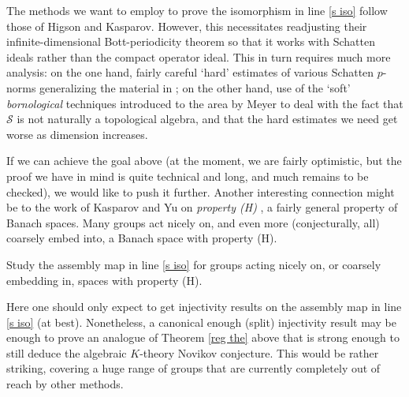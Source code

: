The methods we want to employ to prove the isomorphism in line \eqref{s iso} follow those of Higson and Kasparov.  However, this necessitates readjusting their infinite-dimensional Bott-periodicity theorem \cite{Higson:1999be} so that it works with Schatten ideals rather than the compact operator ideal.  This in turn requires much more analysis: on the one hand, fairly careful `hard' estimates of various Schatten $p$-norms generalizing the material in \cite[Chapter 4]{Simon:2005aa}; on the other hand, use of the `soft' \emph{bornological} techniques introduced to the area by Meyer \cite{Meyer:2007aa} to deal with the fact that $\mathcal{S}$ is not naturally a topological algebra, and that the hard estimates we need get worse as dimension increases.

If we can achieve the goal above (at the moment, we are fairly optimistic, but the proof we have in mind is quite technical and long, and much remains to be checked), we would like to push it further.  Another interesting connection might be to the work of Kasparov and Yu on \emph{property (H)} \cite{Kasparov:2009jt}, a fairly general property of Banach spaces.  Many groups act nicely on, and even more (conjecturally, all) coarsely embed into, a Banach space with property (H).

\begin{project}
Study the assembly map in line \eqref{s iso} for groups acting nicely on, or coarsely embedding in, spaces with property (H).
\end{project}

Here one should only expect to get injectivity results on the assembly map in line \eqref{s iso} (at best).  Nonetheless, a canonical enough (split) injectivity result may be enough to prove an analogue of Theorem \ref{reg the} above that is strong enough to still deduce the algebraic $K$-theory Novikov conjecture.  This would be rather striking, covering a huge range of groups that are currently completely out of reach by other methods.











 

